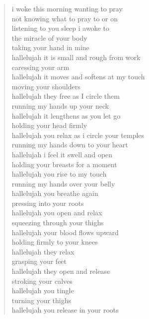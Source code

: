 \begin{verse}
i woke this morning wanting to pray \\
not knowing what to pray to or on \\
listening to you sleep i awoke to \\
the miracle of your body \\
taking your hand in mine \\
hallelujah it is small and rough from work \\
caressing your arm \\
hallelujah it moves and softens at my touch \\
moving your shoulders \\
hallelujah they free as I circle them \\
running my hands up your neck \\
hallelujah it lengthens as you let go \\
holding your head firmly  \\
hallelujah you relax as i circle your temples \\
running my hands down to your heart \\
hallelujah i feel it swell and open \\
holding your breasts for a moment \\
hallelujah you rise to my touch \\
running my hands over your belly \\
hallelujah you breathe again \\
pressing into your roots \\
hallelujah you open and relax \\
squeezing through your thighs  \\
hallelujah your blood flows upward \\
holding firmly to your knees  \\
hallelujah they relax \\
grasping your feet \\
hallelujah they open and release \\
stroking your calves  \\
hallelujah you tingle \\
turning your thighs  \\
hallelujah you release in your roots \\

\end{verse}
